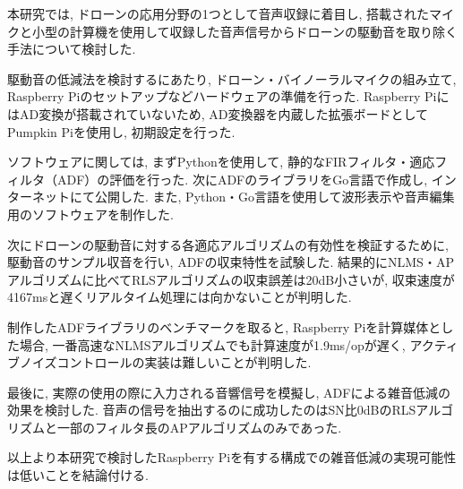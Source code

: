 \begin{jabstract}
本研究では, ドローンの応用分野の1つとして音声収録に着目し, 搭載されたマイクと小型の計算機を使用して収録した音声信号からドローンの駆動音を取り除く手法について検討した. 

駆動音の低減法を検討するにあたり, ドローン・バイノーラルマイクの組み立て, Raspberry
Piのセットアップなどハードウェアの準備を行った.  Raspberry
PiにはAD変換が搭載されていないため, AD変換器を内蔵した拡張ボードとしてPumpkin Piを使用し, 初期設定を行った. 

ソフトウェアに関しては, まずPythonを使用して, 静的なFIRフィルタ・適応フィルタ（ADF）の評価を行った. 次にADFのライブラリをGo言語で作成し, インターネットにて公開した. また, Python・Go言語を使用して波形表示や音声編集用のソフトウェアを制作した. 

次にドローンの駆動音に対する各適応アルゴリズムの有効性を検証するために, 駆動音のサンプル収音を行い, ADFの収束特性を試験した. 結果的にNLMS・APアルゴリズムに比べてRLSアルゴリズムの収束誤差は20dB小さいが, 収束速度が4167msと遅くリアルタイム処理には向かないことが判明した. 

制作したADFライブラリのベンチマークを取ると, Raspberry Piを計算媒体とした場合, 一番高速なNLMSアルゴリズムでも計算速度が1.9ms/opが遅く, アクティブノイズコントロールの実装は難しいことが判明した. 

最後に, 実際の使用の際に入力される音響信号を模擬し, ADFによる雑音低減の効果を検討した. 音声の信号を抽出するのに成功したのはSN比0dBのRLSアルゴリズムと一部のフィルタ長のAPアルゴリズムのみであった. 

以上より本研究で検討したRaspberry Piを有する構成での雑音低減の実現可能性は低いことを結論付ける. 
\end{jabstract}
